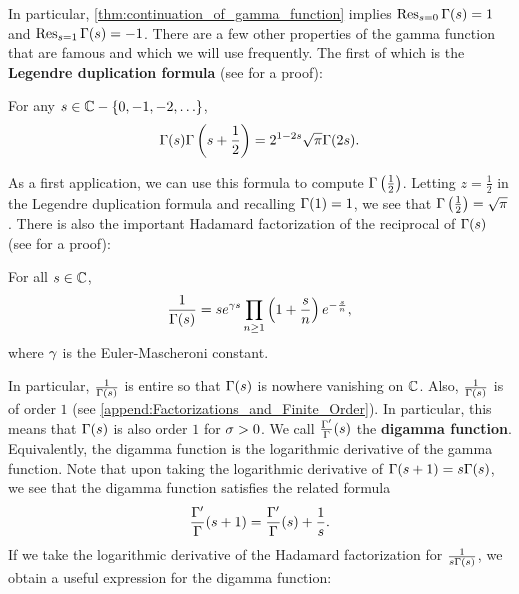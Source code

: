     In particular, \cref{thm:continuation_of_gamma_function} implies $\operatorname*{\mathrm{Res}}_{s = 0}\Gamma(s) = 1$ and $\operatorname*{\mathrm{Res}}_{s = 1}\Gamma(s) = -1$. There are a few other properties of the gamma function that are famous and which we will use frequently. The first of which is the \textbf{Legendre duplication formula} (see \cite{remmert1998classical} for a proof):

    \begin{theorem*}
      For any $s \in \mathbb{C}-\{0,-1,-2,\ldots\}$,
      \[
        \Gamma(s)\Gamma\left(s+\frac{1}{2}\right) = 2^{1-2s}\sqrt{\pi}\Gamma(2s).
      \]
    \end{theorem*}

    As a first application, we can use this formula to compute $\Gamma\left(\frac{1}{2}\right)$. Letting $z = \frac{1}{2}$ in the Legendre duplication formula and recalling $\Gamma(1) = 1$, we see that $\Gamma\left(\frac{1}{2}\right) = \sqrt{\pi}$. There is also the important Hadamard factorization of the reciprocal of $\Gamma(s)$ (see \cite{stein2003complex} for a proof):

    \begin{proposition}\label{prop:Hadamard_factorization_for_reciprocial_of_gamma}
      For all $s \in \mathbb{C}$,
      \[
        \frac{1}{\Gamma(s)} = se^{\gamma s}\prod_{n \ge 1}\left(1+\frac{s}{n}\right)e^{-\frac{s}{n}},
      \]
      where $\gamma$ is the Euler-Mascheroni constant.
    \end{proposition}

    In particular, $\frac{1}{\Gamma(s)}$ is entire so that $\Gamma(s)$ is nowhere vanishing on $\mathbb{C}$. Also, $\frac{1}{\Gamma(s)}$ is of order $1$ (see \cref{append:Factorizations_and_Finite_Order}). In particular, this means that $\Gamma(s)$ is also order $1$ for $\sigma > 0$. We call $\frac{\Gamma'}{\Gamma}(s)$ the \textbf{digamma function}. Equivalently, the digamma function is the logarithmic derivative of the gamma function. Note that upon taking the logarithmic derivative of $\Gamma(s+1) = s\Gamma(s)$, we see that the digamma function satisfies the related formula
    \[
      \frac{\Gamma'}{\Gamma}(s+1) = \frac{\Gamma'}{\Gamma}(s)+\frac{1}{s}.
    \]
    If we take the logarithmic derivative of the Hadamard factorization for $\frac{1}{s\Gamma(s)}$, we obtain a useful expression for the digamma function:

